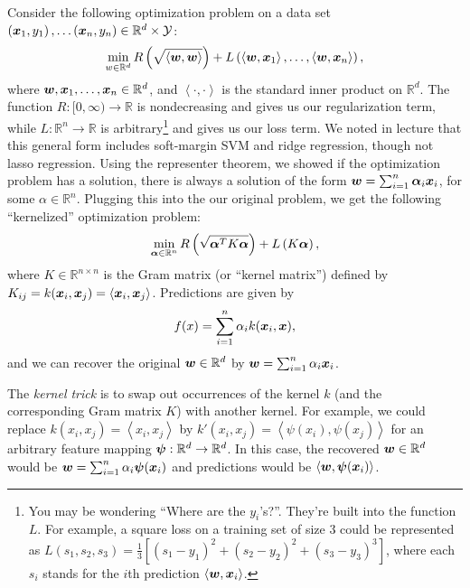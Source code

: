 \documentclass{article}
\theoremstyle{plain}
\theoremstyle{definition}
\begin{document}
Consider the following optimization problem on a data set $\left(\boldsymbol{x}_{1},y_{1}\right),\ldots\left(\boldsymbol{x}_{n},y_{n}\right)\in\mathbb{R}^{d}\times\mathcal{Y}$:
\[
\min_{w\in\mathbb{R}^{d}}R\left(\sqrt{\left\langle \boldsymbol{w},\boldsymbol{w}\right\rangle }\right)+L\left(\left\langle \boldsymbol{w},\boldsymbol{x}_{1}\right\rangle ,\ldots,\left\langle \boldsymbol{w},\boldsymbol{x}_{n}\right\rangle \right),
\]
where $\boldsymbol{w},\boldsymbol{x}_{1},\ldots,\boldsymbol{x}_{n}\in\mathbb{R}^{d}$, and $\left\langle \cdot,\cdot\right\rangle $
is the standard inner product on $\mathbb{R}^{d}$. The function $R:[0,\infty)\to\mathbb{R}$
is nondecreasing and gives us our regularization term, while $L:\mathbb{R}^{n}\to\mathbb{R}$ is arbitrary\footnote{You may be wondering ``Where are the $y_{i}$'s?''. They're built
into the function $L$. For example, a square loss on a training set
of size $3$ could be represented as $L(s_{1},s_{2},s_{3})=\frac{1}{3}\left[\left(s_{1}-y_{1}\right)^{2}+\left(s_{2}-y_{2}\right)^{2}+\left(s_{3}-y_{3}\right)^{3}\right]$,
where each $s_{i}$ stands for the $i$th prediction $\left\langle \boldsymbol{w}, \boldsymbol{x}_{i}\right\rangle $. } and gives us our loss term. We noted in lecture that this general
form includes soft-margin SVM and ridge regression, though not lasso
regression. Using the representer theorem, we showed if the optimization
problem has a solution, there is always a solution of the form $\boldsymbol{w}=\sum_{i=1}^{n}\boldsymbol{\alpha}_{i} \boldsymbol{x}_{i}$,
for some $\alpha\in\mathbb{R}^{n}$. Plugging this into the our original
problem, we get the following ``kernelized'' optimization problem:
\[
\min_{\boldsymbol{\alpha}\in\mathbb{R}^{n}}R\left(\sqrt{\boldsymbol{\alpha}^{T}K \boldsymbol{\alpha}}\right)+L\left(K\boldsymbol{\alpha}\right),
\]
where $K\in\mathbb{R}^{n\times n}$ is the Gram matrix (or ``kernel matrix'')
defined by $K_{ij}=k(\boldsymbol{x}_{i},\boldsymbol{x}_{j})=\left\langle \boldsymbol{x}_{i}, \boldsymbol{x}_{j}\right\rangle $.
Predictions are given by
\[
f(x)=\sum_{i=1}^{n} \alpha_{i}k(\boldsymbol{x}_{i}, \boldsymbol{x}),
\]
and we can recover the original $\boldsymbol{w}\in\mathbb{R}^{d}$ by $\boldsymbol{w}=\sum_{i=1}^{n}\alpha_{i} \boldsymbol{x}_{i}$.

The \emph{kernel trick} is to swap out occurrences of the
kernel $k$ (and the corresponding Gram matrix $K$) with another
kernel. For example, we could replace $k(x_{i},x_{j})=\left\langle x_{i},x_{j}\right\rangle $
by $k'(x_{i},x_{j})=\left\langle \psi(x_{i}),\psi(x_{j})\right\rangle $
for an arbitrary feature mapping $\boldsymbol{\psi}:\mathbb{R}^{d}\to\mathbb{R}^{d}$.
In this case, the recovered $\boldsymbol{w}\in\mathbb{R}^{d}$ would be $\boldsymbol{w}=\sum_{i=1}^{n}\alpha_{i}\boldsymbol{\psi}(\boldsymbol{x}_{i})$
and predictions would be $\left\langle \boldsymbol{w}, \boldsymbol{\psi}(\boldsymbol{x}_{i})\right\rangle $\@.
\end{document}
